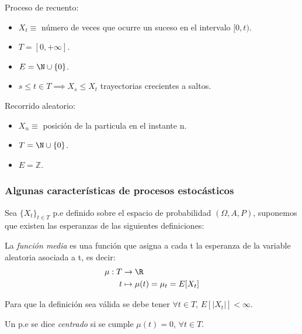 \begin{ejemplo}
  Proceso de recuento:
  \begin{itemize}
    \item $X_t \equiv$ número de veces que ocurre un suceso en el intervalo $[0, t)$.
    \item $T = [0, + \infty]$.
    \item $E = \N \cup \{0\}$.
    \item $s \leq t \in T \implies X_s \leq X_t$ trayectorias crecientes a saltos.
  \end{itemize}
\end{ejemplo}

\begin{ejemplo}
  Recorrido aleatorio:
  \begin{itemize}
    \item $X_n \equiv$ posición de la particula en el instante n.
    \item $T = \N \cup \{0\}$.
    \item $E = \mathbb{Z}$.
  \end{itemize}
\end{ejemplo}

\subsubsection{Algunas características de procesos estocásticos}

Sea $\{X_t\}_{t \in T}$ p.e definido sobre el espacio de probabilidad $(\Omega, A, P)$, suponemos que existen las esperanzas de las siguientes definiciones:

\begin{ndef}
  La \emph{función media} es una función que asigna a cada t la esperanza de la variable aleatoria asociada a t, es decir:
  \begin{align*}
    \mu: T & \to \R \\
    t & \mapsto \mu(t) = \mu_t = E[X_t]
  \end{align*}
\end{ndef}

\begin{nota}
  Para que la definición sea válida se debe tener $\forall t \in T$, $E[|X_t|] < \infty$.
\end{nota}

\begin{ndef}
  Un p.e se dice \emph{centrado} si se cumple $\mu(t) = 0$, $\forall t \in T$.
\end{ndef}

